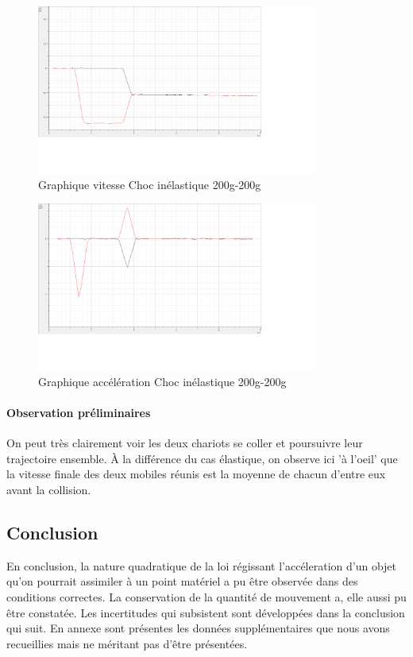 \begin{figure}[h]
    \caption[Graphique vitesse Choc inélastique 200g-200g]{Graphique vitesse Choc inélastique 200g-200g}
    \centering
    \includegraphics[height=15em]{Data/200-200inela02v.png}
\end{figure}

\begin{figure}[h]
    \caption[Graphique accélération Choc inélastique 200g-200g]{Graphique accélération Choc inélastique 200g-200g}
    \centering
    \includegraphics[height=15em]{Data/200-200inela02a.png}
\end{figure}

\paragraph{Observation préliminaires}
On peut très clairement voir les deux chariots se coller et poursuivre leur trajectoire ensemble.
À la différence du cas élastique, on observe ici 'à l'oeil' que la vitesse finale des deux mobiles réunis est la moyenne de chacun d'entre eux avant la collision.

\subsection{Conclusion}
En conclusion, la nature quadratique de la loi régissant l'accéleration d'un objet qu'on pourrait assimiler à un point matériel a pu être observée dans des conditions correctes.
La conservation de la quantité de mouvement a, elle aussi pu être constatée. Les incertitudes qui subsistent sont développées dans la conclusion qui suit.
En annexe sont présentes les données supplémentaires que nous avons recueillies mais ne méritant pas d'être présentées.
